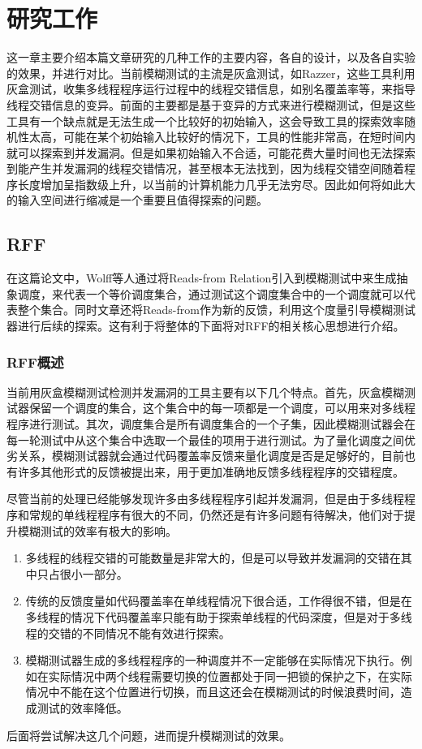 
\section{研究工作}
这一章主要介绍本篇文章\cite{wolff2024greybox}研究的几种工作的主要内容，各自的设计，以及各自实验的效果，并进行对比。当前模糊测试的主流是灰盒测试，如Razzer\cite{jeong2019razzer}，这些工具利用灰盒测试，收集多线程程序运行过程中的线程交错信息，如别名覆盖率\cite{xu2020krace}等，来指导线程交错信息的变异。前面的主要都是基于变异的方式来进行模糊测试，但是这些工具有一个缺点就是无法生成一个比较好的初始输入，这会导致工具的探索效率随机性太高，可能在某个初始输入比较好的情况下，工具的性能非常高，在短时间内就可以探索到并发漏洞。但是如果初始输入不合适，可能花费大量时间也无法探索到能产生并发漏洞的线程交错情况，甚至根本无法找到，因为线程交错空间随着程序长度增加呈指数级上升，以当前的计算机能力几乎无法穷尽。因此如何将如此大的输入空间进行缩减是一个重要且值得探索的问题。

\subsection{RFF}

在这篇论文中，Wolff\cite{wolff2024greybox}等人通过将Reads-from Relation引入到模糊测试中来生成抽象调度，来代表一个等价调度集合，通过测试这个调度集合中的一个调度就可以代表整个集合。同时文章还将Reads-from作为新的反馈，利用这个度量引导模糊测试器进行后续的探索。这有利于将整体的下面将对RFF的相关核心思想进行介绍。

\subsubsection{RFF概述}

当前用灰盒模糊测试检测并发漏洞的工具主要有以下几个特点。首先，灰盒模糊测试器保留一个调度的集合，这个集合中的每一项都是一个调度，可以用来对多线程程序进行测试。其次，调度集合是所有调度集合的一个子集，因此模糊测试器会在每一轮测试中从这个集合中选取一个最佳的项用于进行测试。为了量化调度之间优劣关系，模糊测试器就会通过代码覆盖率反馈来量化调度是否是足够好的，目前也有许多其他形式的反馈被提出来，用于更加准确地反馈多线程程序的交错程度。

尽管当前的处理已经能够发现许多由多线程程序引起并发漏洞，但是由于多线程程序和常规的单线程程序有很大的不同，仍然还是有许多问题有待解决，他们对于提升模糊测试的效率有极大的影响。
\begin{enumerate}
\item 多线程的线程交错的可能数量是非常大的，但是可以导致并发漏洞的交错在其中只占很小一部分。
\item 传统的反馈度量如代码覆盖率在单线程情况下很合适，工作得很不错，但是在多线程的情况下代码覆盖率只能有助于探索单线程的代码深度，但是对于多线程的交错的不同情况不能有效进行探索。
\item 模糊测试器生成的多线程程序的一种调度并不一定能够在实际情况下执行。例如在实际情况中两个线程需要切换的位置都处于同一把锁的保护之下，在实际情况中不能在这个位置进行切换，而且这还会在模糊测试的时候浪费时间，造成测试的效率降低。
\end{enumerate}
后面将尝试解决这几个问题，进而提升模糊测试的效果。

